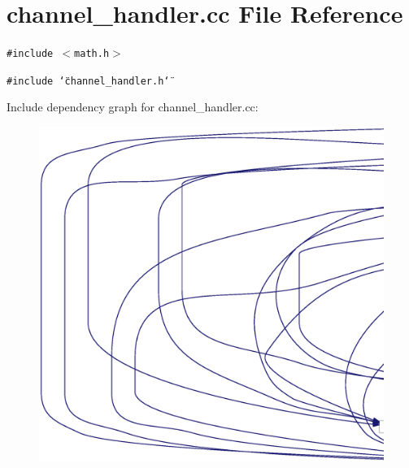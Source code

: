 \section{channel\_\-handler.cc File Reference}
\label{channel__handler_8cc}
{\tt \#include $<$math.h$>$}\par
{\tt \#include \char`\"{}channel\_\-handler.h\char`\"{}}\par


Include dependency graph for channel\_\-handler.cc:\nopagebreak
\begin{figure}[H]
\begin{center}
\leavevmode
\includegraphics[width=420pt]{channel__handler_8cc__incl}
\end{center}
\end{figure}
